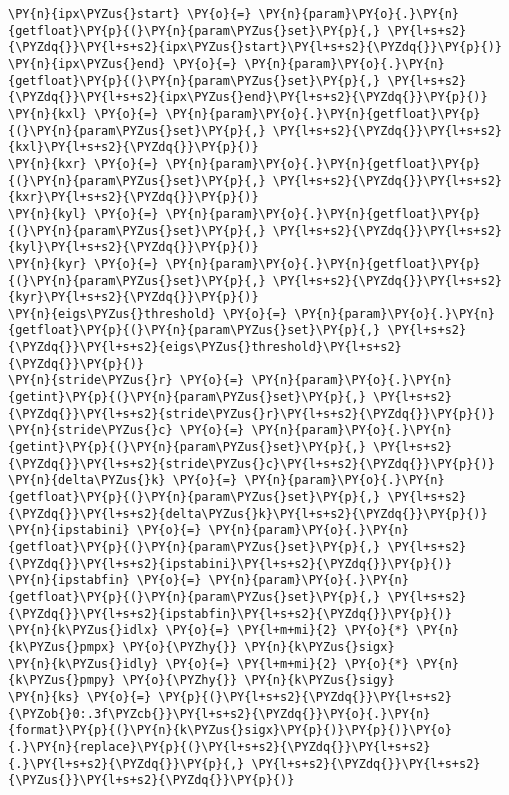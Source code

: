 \begin{Verbatim}[commandchars=\\\{\}]
\PY{n}{ipx\PYZus{}start} \PY{o}{=} \PY{n}{param}\PY{o}{.}\PY{n}{getfloat}\PY{p}{(}\PY{n}{param\PYZus{}set}\PY{p}{,} \PY{l+s+s2}{\PYZdq{}}\PY{l+s+s2}{ipx\PYZus{}start}\PY{l+s+s2}{\PYZdq{}}\PY{p}{)}
\PY{n}{ipx\PYZus{}end} \PY{o}{=} \PY{n}{param}\PY{o}{.}\PY{n}{getfloat}\PY{p}{(}\PY{n}{param\PYZus{}set}\PY{p}{,} \PY{l+s+s2}{\PYZdq{}}\PY{l+s+s2}{ipx\PYZus{}end}\PY{l+s+s2}{\PYZdq{}}\PY{p}{)}
\PY{n}{kxl} \PY{o}{=} \PY{n}{param}\PY{o}{.}\PY{n}{getfloat}\PY{p}{(}\PY{n}{param\PYZus{}set}\PY{p}{,} \PY{l+s+s2}{\PYZdq{}}\PY{l+s+s2}{kxl}\PY{l+s+s2}{\PYZdq{}}\PY{p}{)}
\PY{n}{kxr} \PY{o}{=} \PY{n}{param}\PY{o}{.}\PY{n}{getfloat}\PY{p}{(}\PY{n}{param\PYZus{}set}\PY{p}{,} \PY{l+s+s2}{\PYZdq{}}\PY{l+s+s2}{kxr}\PY{l+s+s2}{\PYZdq{}}\PY{p}{)}
\PY{n}{kyl} \PY{o}{=} \PY{n}{param}\PY{o}{.}\PY{n}{getfloat}\PY{p}{(}\PY{n}{param\PYZus{}set}\PY{p}{,} \PY{l+s+s2}{\PYZdq{}}\PY{l+s+s2}{kyl}\PY{l+s+s2}{\PYZdq{}}\PY{p}{)}
\PY{n}{kyr} \PY{o}{=} \PY{n}{param}\PY{o}{.}\PY{n}{getfloat}\PY{p}{(}\PY{n}{param\PYZus{}set}\PY{p}{,} \PY{l+s+s2}{\PYZdq{}}\PY{l+s+s2}{kyr}\PY{l+s+s2}{\PYZdq{}}\PY{p}{)}
\PY{n}{eigs\PYZus{}threshold} \PY{o}{=} \PY{n}{param}\PY{o}{.}\PY{n}{getfloat}\PY{p}{(}\PY{n}{param\PYZus{}set}\PY{p}{,} \PY{l+s+s2}{\PYZdq{}}\PY{l+s+s2}{eigs\PYZus{}threshold}\PY{l+s+s2}{\PYZdq{}}\PY{p}{)}
\PY{n}{stride\PYZus{}r} \PY{o}{=} \PY{n}{param}\PY{o}{.}\PY{n}{getint}\PY{p}{(}\PY{n}{param\PYZus{}set}\PY{p}{,} \PY{l+s+s2}{\PYZdq{}}\PY{l+s+s2}{stride\PYZus{}r}\PY{l+s+s2}{\PYZdq{}}\PY{p}{)}
\PY{n}{stride\PYZus{}c} \PY{o}{=} \PY{n}{param}\PY{o}{.}\PY{n}{getint}\PY{p}{(}\PY{n}{param\PYZus{}set}\PY{p}{,} \PY{l+s+s2}{\PYZdq{}}\PY{l+s+s2}{stride\PYZus{}c}\PY{l+s+s2}{\PYZdq{}}\PY{p}{)}
\PY{n}{delta\PYZus{}k} \PY{o}{=} \PY{n}{param}\PY{o}{.}\PY{n}{getfloat}\PY{p}{(}\PY{n}{param\PYZus{}set}\PY{p}{,} \PY{l+s+s2}{\PYZdq{}}\PY{l+s+s2}{delta\PYZus{}k}\PY{l+s+s2}{\PYZdq{}}\PY{p}{)}
\PY{n}{ipstabini} \PY{o}{=} \PY{n}{param}\PY{o}{.}\PY{n}{getfloat}\PY{p}{(}\PY{n}{param\PYZus{}set}\PY{p}{,} \PY{l+s+s2}{\PYZdq{}}\PY{l+s+s2}{ipstabini}\PY{l+s+s2}{\PYZdq{}}\PY{p}{)}
\PY{n}{ipstabfin} \PY{o}{=} \PY{n}{param}\PY{o}{.}\PY{n}{getfloat}\PY{p}{(}\PY{n}{param\PYZus{}set}\PY{p}{,} \PY{l+s+s2}{\PYZdq{}}\PY{l+s+s2}{ipstabfin}\PY{l+s+s2}{\PYZdq{}}\PY{p}{)}
\PY{n}{k\PYZus{}idlx} \PY{o}{=} \PY{l+m+mi}{2} \PY{o}{*} \PY{n}{k\PYZus{}pmpx} \PY{o}{\PYZhy{}} \PY{n}{k\PYZus{}sigx}
\PY{n}{k\PYZus{}idly} \PY{o}{=} \PY{l+m+mi}{2} \PY{o}{*} \PY{n}{k\PYZus{}pmpy} \PY{o}{\PYZhy{}} \PY{n}{k\PYZus{}sigy}
\PY{n}{ks} \PY{o}{=} \PY{p}{(}\PY{l+s+s2}{\PYZdq{}}\PY{l+s+s2}{\PYZob{}0:.3f\PYZcb{}}\PY{l+s+s2}{\PYZdq{}}\PY{o}{.}\PY{n}{format}\PY{p}{(}\PY{n}{k\PYZus{}sigx}\PY{p}{)}\PY{p}{)}\PY{o}{.}\PY{n}{replace}\PY{p}{(}\PY{l+s+s2}{\PYZdq{}}\PY{l+s+s2}{.}\PY{l+s+s2}{\PYZdq{}}\PY{p}{,} \PY{l+s+s2}{\PYZdq{}}\PY{l+s+s2}{\PYZus{}}\PY{l+s+s2}{\PYZdq{}}\PY{p}{)}

\end{Verbatim}
